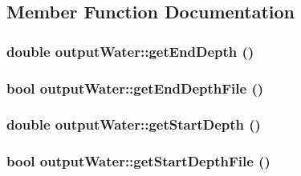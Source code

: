 \subsection{Member Function Documentation}
\hypertarget{classoutput_water_aec11bb25c47d1c0269cb128be2fd9113}{
\subsubsection[{getEndDepth}]{\setlength{\rightskip}{0pt plus 5cm}double outputWater::getEndDepth ()}}
\label{classoutput_water_aec11bb25c47d1c0269cb128be2fd9113}
\hypertarget{classoutput_water_aa98136f7e042a2215c8bd48c94ef09b6}{
\subsubsection[{getEndDepthFile}]{\setlength{\rightskip}{0pt plus 5cm}bool outputWater::getEndDepthFile ()}}
\label{classoutput_water_aa98136f7e042a2215c8bd48c94ef09b6}
\hypertarget{classoutput_water_ab7e3bf34250d2975447600911fad3a35}{
\subsubsection[{getStartDepth}]{\setlength{\rightskip}{0pt plus 5cm}double outputWater::getStartDepth ()}}
\label{classoutput_water_ab7e3bf34250d2975447600911fad3a35}
\hypertarget{classoutput_water_a97c06dddb83eb66a807c6566f62ac0d1}{
\subsubsection[{getStartDepthFile}]{\setlength{\rightskip}{0pt plus 5cm}bool outputWater::getStartDepthFile ()}}
